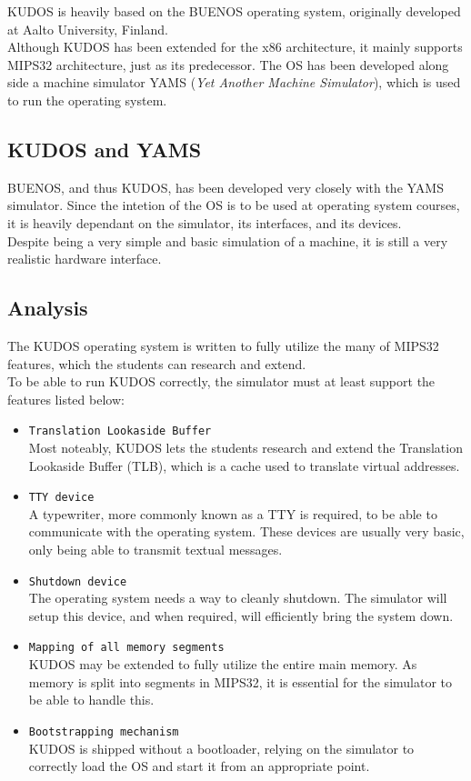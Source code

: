 KUDOS is heavily based on the BUENOS operating system, originally developed at
Aalto University, Finland\cite{readthedocs:kudos}.\\
Although KUDOS has been extended for the x86 architecture, it mainly supports
MIPS32 architecture, just as its predecessor. The OS has been developed along
side a machine simulator YAMS (\textit{Yet Another Machine Simulator}), which
is used to run the operating system.\cite{readthedocs:kudos}


\subsection{KUDOS and YAMS}
BUENOS, and thus KUDOS, has been developed very closely with the YAMS simulator.
Since the intetion of the OS is to be used at operating system courses, it is
heavily dependant on the simulator, its interfaces, and its devices.\\
Despite being a very simple and basic simulation of a machine, it is still a
very realistic hardware interface.


\subsection{Analysis}
The KUDOS operating system is written to fully utilize the many of MIPS32 features,
which the students can research and extend.\\
To be able to run KUDOS correctly, the simulator must at least support the features
listed below:
\begin{itemize}
	\item \texttt{Translation Lookaside Buffer}\\
Most noteably, KUDOS lets the students research and extend the Translation
Lookaside Buffer (TLB), which is a cache used to translate virtual addresses\cite{COD5}.\\

	\item \texttt{TTY device}\\
A typewriter, more commonly known as a TTY is required, to be able to communicate
with the operating system. These devices are usually very basic, only being able
to transmit textual messages.

	\item \texttt{Shutdown device}\\
The operating system needs a way to cleanly shutdown. The simulator will setup
this device, and when required, will efficiently bring the system down.

	\item \texttt{Mapping of all memory segments}\\
KUDOS may be extended to fully utilize the entire main memory. As memory is
split into segments in MIPS32, it is essential for the simulator to be able to
handle this.

	\item \texttt{Bootstrapping mechanism}\\
KUDOS is shipped without a bootloader, relying on the simulator to correctly
load the OS and start it from an appropriate point.
\end{itemize}



